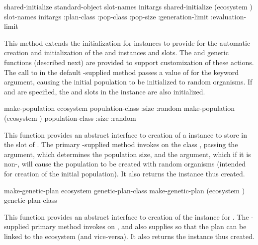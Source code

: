 {\samepage

\Eggeneric shared-initialize {standard-object slot-names \rest initargs}
 shared-initialize {(ecosystem ) slot-names \rest initargs
	\key :plan-class :pop-class :pop-size :generation-limit :evaluation-limit}

This method extends the initialization for  instances to provide for the 
automatic creation and initialization of the  and 
instances and slots.
The  and  generic functions (described
next) are provided to support customization of these actions.
The call to  in the default \geco-supplied method
passes a value of  for the  keyword
argument, causing the initial population to be initialized to random organisms.
If  and  are specified, the 
and  slots in the  instance are also initialized.
\par}%

\filbreak

{\samepage

\Defgeneric make-population {ecosystem population-class \key :size :random}
 make-population {(ecosystem ) population-class
	\key :size :random}
	\label{method:make-population}

This function provides an abstract interface to creation of a  instance
to store in the  slot of .
The primary \geco-supplied method
invokes  on the class , passing
the  argument, which determines the population size, and the
 argument, which if it is non-, will cause the population to
be created with random organisms (intended for creation of the initial population).
It also returns the  instance thus created.
\par}%

\filbreak

{\samepage
\Defgeneric make-genetic-plan {ecosystem genetic-plan-class}
 make-genetic-plan {(ecosystem ) genetic-plan-class}
	\label{method:make-genetic-plan}

This function provides an abstract interface to creation of the 
instance for .  The \geco-supplied primary method invokes
 on , and also supplies
 so that the plan can be linked to the ecosystem (and vice-versa).
It also returns the  instance thus created.
\par}%

